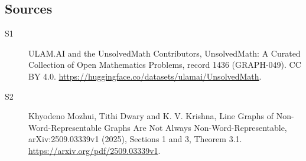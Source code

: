 \documentclass[11pt]{article}
\begin{document}
\subsection{Sources}
\begin{description}
\item[\hypertarget{source:1436:1}{S1}] ULAM.AI and the UnsolvedMath Contributors, UnsolvedMath: A Curated Collection of Open Mathematics Problems, record 1436 (GRAPH-049). CC BY 4.0. \url{https://huggingface.co/datasets/ulamai/UnsolvedMath}.
\item[\hypertarget{source:1436:2}{S2}] Khyodeno Mozhui, Tithi Dwary and K. V. Krishna, Line Graphs of Non-Word-Representable Graphs Are Not Always Non-Word-Representable, arXiv:2509.03339v1 (2025), Sections 1 and 3, Theorem 3.1. \url{https://arxiv.org/pdf/2509.03339v1}.
\end{description}
\label{end:1436}
\end{document}
